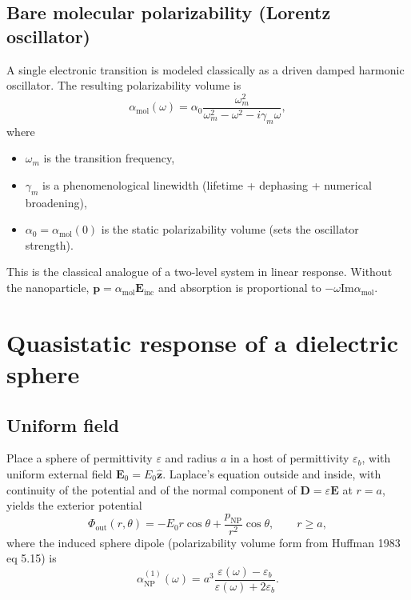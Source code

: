 \documentclass[11pt,a4paper]{article}
\theoremstyle{definition}
\newcommand{\epsb}{\varepsilon_b}
\newcommand{\epsm}{\varepsilon}
\newcommand{\alpham}{\alpha_{\text{mol}}}
\newcommand{\alphanp}{\alpha_{\text{NP}}}
\newcommand{\Einc}{\mathbf{E}_{\mathrm{inc}}}
\newcommand{\p}{\mathbf{p}}
\begin{document}
\subsection{Bare molecular polarizability (Lorentz oscillator)}

\noindent
A single electronic transition is modeled classically as a driven damped harmonic oscillator. The resulting polarizability volume is
\begin{equation}
  \alpham(\omega)
  =
  \alpha_0 
  \frac{\omega_m^2}{\omega_m^2 - \omega^2 - i\gamma_m\omega} ,
  \label{eq:alpha-m}
\end{equation}
where

\begin{itemize}[leftmargin=1.6em]
  \item $\omega_m$ is the transition frequency,
  \item $\gamma_m$ is a phenomenological linewidth (lifetime + dephasing + numerical broadening),
  \item $\alpha_0=\alpham(0)$ is the static polarizability volume (sets the oscillator strength).
\end{itemize}

\noindent
This is the classical analogue of a two-level system in linear response. Without the nanoparticle, $\p=\alpham\Einc$ and absorption is proportional to $-\omega \mathrm{Im} \alpham$.

\section{Quasistatic response of a dielectric sphere}

\subsection{Uniform field}

\noindent
Place a sphere of permittivity $\epsm$ and radius $a$ in a host of permittivity $\epsb$, with uniform external field $\mathbf{E}_0=E_0\hat{\mathbf{z}}$. Laplace's equation outside and inside, with continuity of the potential and of the normal component of $\mathbf{D}=\varepsilon\mathbf{E}$ at $r=a$, yields the exterior potential
\begin{equation}
  \Phi_{\mathrm{out}}(r,\theta)
  =
  -E_0 r\cos\theta
  +
  \frac{p_{\mathrm{NP}}}{r^2}\cos\theta ,
  \qquad
  r\ge a ,
\end{equation}
where the induced sphere dipole (polarizability volume form from Huffman 1983 eq 5.15) is
\begin{equation}
  \alphanp^{(1)}(\omega)
  =
  a^3
  \frac{\epsm(\omega)-\epsb}{\epsm(\omega)+2\epsb}.
  \label{eq:beta1}
\end{equation}
\end{document}
